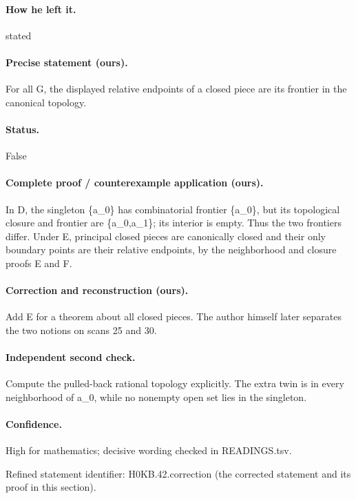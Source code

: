 \paragraph{How he left it.} stated

\paragraph{Precise statement (ours).} For all G, the displayed relative endpoints of a closed piece are its frontier in the canonical topology.

\paragraph{Status.} False

\paragraph{Complete proof / counterexample application (ours).} In D, the singleton \{a\_0\} has combinatorial frontier \{a\_0\}, but its topological closure and frontier are \{a\_0,a\_1\}; its interior is empty. Thus the two frontiers differ. Under E, principal closed pieces are canonically closed and their only boundary points are their relative endpoints, by the neighborhood and closure proofs E and F.

\paragraph{Correction and reconstruction (ours).} Add E for a theorem about all closed pieces. The author himself later separates the two notions on scans 25 and 30.

\paragraph{Independent second check.} Compute the pulled-back rational topology explicitly. The extra twin is in every neighborhood of a\_0, while no nonempty open set lies in the singleton.

\paragraph{Confidence.} High for mathematics; decisive wording checked in READINGS.tsv.

\noindent Refined statement identifier: H0KB.42.correction (the corrected statement and its proof in this section).

